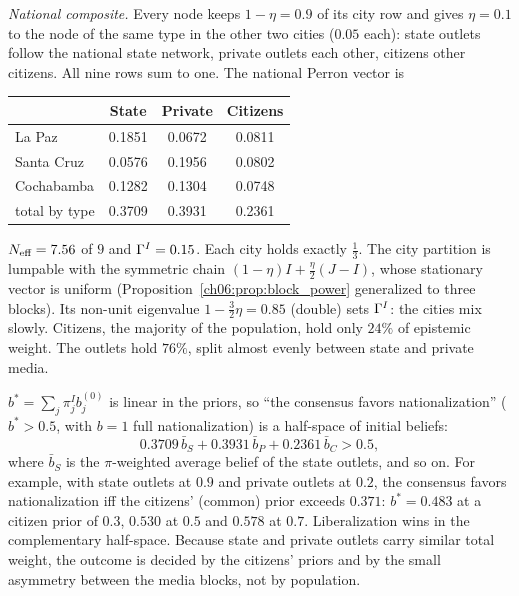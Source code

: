 \documentclass[../solutions_manual.tex]{subfiles}
\begin{document}
 \emph{National composite.} Every node keeps $1 - \eta = 0.9$ of its city row and gives $\eta = 0.1$ to the node of the same type in the other two cities ($0.05$ each): state outlets follow the national state network, private outlets each other, citizens other citizens. All nine rows sum to one. The national Perron vector is
\begin{center}
\begin{tabular}{lccc}
\toprule
& State & Private & Citizens \\
\midrule
La Paz & 0.1851 & 0.0672 & 0.0811 \\
Santa Cruz & 0.0576 & 0.1956 & 0.0802 \\
Cochabamba & 0.1282 & 0.1304 & 0.0748 \\
\midrule
total by type & 0.3709 & 0.3931 & 0.2361 \\
\bottomrule
\end{tabular}
\end{center}
$N_{\text{eff}} = 7.56$ of $9$ and $\Gamma^I = 0.15$. Each city holds exactly $\frac13$. The city partition is lumpable with the symmetric chain $(1-\eta)I + \frac{\eta}{2}(J - I)$, whose stationary vector is uniform (Proposition~\ref{ch06:prop:block_power} generalized to three blocks). Its non-unit eigenvalue $1 - \frac32\eta = 0.85$ (double) sets $\Gamma^I$: the cities mix slowly. Citizens, the majority of the population, hold only $24\%$ of epistemic weight. The outlets hold $76\%$, split almost evenly between state and private media.

 $b^* = \sum_j\pi^I_jb^{(0)}_j$ is linear in the priors, so ``the consensus favors nationalization'' ($b^* > 0.5$, with $b = 1$ full nationalization) is a half-space of initial beliefs:
\[
0.3709\,\bar b_S + 0.3931\,\bar b_P + 0.2361\,\bar b_C > 0.5 ,
\]
where $\bar b_S$ is the $\pi$-weighted average belief of the state outlets, and so on. For example, with state outlets at $0.9$ and private outlets at $0.2$, the consensus favors nationalization iff the citizens' (common) prior exceeds $0.371$: $b^* = 0.483$ at a citizen prior of $0.3$, $0.530$ at $0.5$ and $0.578$ at $0.7$. Liberalization wins in the complementary half-space. Because state and private outlets carry similar total weight, the outcome is decided by the citizens' priors and by the small asymmetry between the media blocks, not by population.
\end{document}
